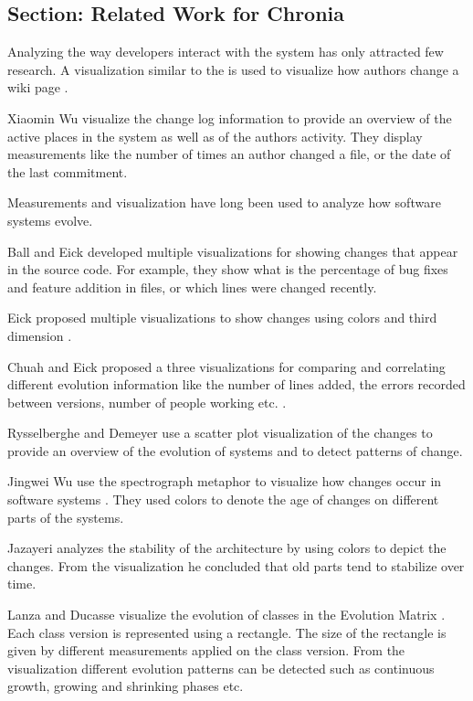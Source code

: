 \subsection{Section: Related Work for Chronia}\label{sec:soa}

Analyzing the way developers interact with the system has only attracted few research. A visualization similar to the \omap is used to visualize how authors change a wiki page \cite{Vieg04a}.

Xiaomin Wu \etal visualize \cite{Wu04b} the change log information to provide an overview of the active places in the system as well as of the authors activity. They display measurements like the number of times an author changed a file, or the date of the last commitment.

Measurements and visualization have long been used to analyze how software systems evolve.

Ball and Eick \cite{Ball96a} developed multiple visualizations for showing changes that appear in the source code. For example, they show what is the percentage of bug fixes and feature addition in files, or which lines were changed recently.

Eick \etal proposed multiple visualizations to show changes using colors and third dimension \cite{Eick02a}.

Chuah and Eick proposed a three visualizations for comparing and correlating different evolution information like the number of lines added, the errors recorded between versions, number of people working etc. \cite{Chua98a}.

Rysselberghe and Demeyer use a scatter plot visualization of the changes  to provide an overview of the evolution of systems and to detect patterns of change\cite{Ryss04a}.

Jingwei Wu \etal use the spectrograph metaphor to visualize how changes occur in software systems \cite{Wu04a}. They used colors to denote the age of changes on different parts of the systems.

Jazayeri analyzes the stability of the architecture \cite{Jaza02a} by using colors to depict the changes. From the visualization he concluded that old parts tend to stabilize over time.

Lanza and Ducasse visualize the evolution of classes in the Evolution Matrix \cite{Lanz02a}. Each class version is represented using a rectangle. The size of the rectangle is given by different measurements applied on the class version. From the visualization different evolution patterns can be detected such as continuous growth, growing and shrinking phases etc.

